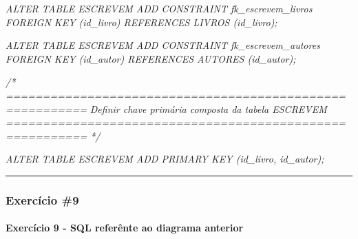 \documentclass[
]{book}
\newenvironment{Shaded}{\begin{snugshade}}{\end{snugshade}}
\newcommand{\CommentTok}[1]{\textcolor[rgb]{0.56,0.35,0.01}{\textit{#1}}}
\begin{document}
\begin{Shaded}
\begin{Highlighting}[]
\CommentTok{ALTER TABLE ESCREVEM ADD CONSTRAINT fk\_escrevem\_livros   FOREIGN KEY (id\_livro) REFERENCES LIVROS (id\_livro);}

\CommentTok{ALTER TABLE ESCREVEM ADD CONSTRAINT fk\_escrevem\_autores  FOREIGN KEY (id\_autor) REFERENCES AUTORES (id\_autor);}

\CommentTok{/* =========================================================}
\CommentTok{   Definir chave primária composta da tabela ESCREVEM}
\CommentTok{   ========================================================= */}

\CommentTok{ALTER TABLE ESCREVEM  ADD PRIMARY KEY (id\_livro, id\_autor);}
\end{Highlighting}
\end{Shaded}

\begin{center}\rule{0.5\linewidth}{0.5pt}\end{center}

\subsubsection{Exercício \#9}\label{exercuxedcio-9}



\paragraph{Exercício 9 - SQL referênte ao diagrama anterior}\label{exercuxedcio-9---sql-referuxeante-ao-diagrama-anterior}
\end{document}

